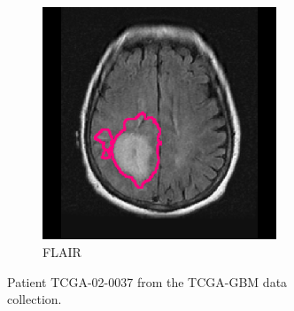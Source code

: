 \begin{subappendices}
\begin{figure}[htbp]
\begin{subfigure}[b]{0.95\textwidth}
\begin{subfigure}[b]{0.215\textwidth}
        \end{subfigure}
        \hfill
        \begin{subfigure}[b]{0.215\textwidth}
        \caption*{\acrshort{FLAIR}}
        \includegraphics[width=\textwidth, clip, trim=2.5cm 0.5cm 2.5cm 0.5cm]{Figures/Random_segs/FLAIR_TCGA-02-0037.png}
        \end{subfigure}
        \caption{Patient TCGA-02-0037 from the TCGA-GBM data collection.}
    \end{subfigure}
    \begin{subfigure}[b]{0.95\textwidth}
        \centering
        \hfill
        \begin{subfigure}[b]{0.215\textwidth}

\end{subfigure}
\end{subfigure}
\end{figure}
\end{subappendices}
